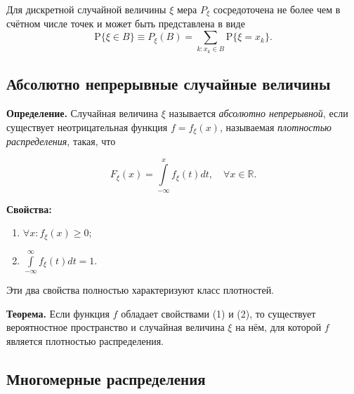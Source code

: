 \documentclass[11pt,a4paper]{article}
\providecommand{\tightlist}{%
      \setlength{\itemsep}{0pt}\setlength{\parskip}{0pt}}
\begin{document}
Для дискретной случайной величины \(\xi\) мера \(P_\xi\) сосредоточена
не более чем в счётном числе точек и может быть представлена в виде \[
  \mathrm{P}\{\xi \in B\} \equiv P_\xi(B) = \sum\limits_{k:x_k \in B} \mathrm{P}\{\xi=x_k\}.
\]

    \hypertarget{ux430ux431ux441ux43eux43bux44eux442ux43dux43e-ux43dux435ux43fux440ux435ux440ux44bux432ux43dux44bux435-ux441ux43bux443ux447ux430ux439ux43dux44bux435-ux432ux435ux43bux438ux447ux438ux43dux44b}{%
\subsection{Абсолютно непрерывные случайные
величины}\label{ux430ux431ux441ux43eux43bux44eux442ux43dux43e-ux43dux435ux43fux440ux435ux440ux44bux432ux43dux44bux435-ux441ux43bux443ux447ux430ux439ux43dux44bux435-ux432ux435ux43bux438ux447ux438ux43dux44b}}

\textbf{Определение.} Случайная величина \(\xi\) называется
\emph{абсолютно непрерывной}, если существует неотрицательная функция
\(f = f_\xi(x)\), называемая \emph{плотностью распределения}, такая, что

\[ F_\xi(x) = \int\limits_{-\infty}^x f_\xi(t) dt, \quad \forall x \in \mathbb{R}. \]

\textbf{Свойства:}

\begin{enumerate}
\def\labelenumi{\arabic{enumi}.}
\tightlist
\item
  \(\forall x: f_\xi (x) \ge 0\);
\item
  \(\int\limits_{-\infty}^{\infty} f_\xi(t) dt = 1\).
\end{enumerate}

Эти два свойства полностью характеризуют класс плотностей.

\textbf{Теорема.} Если функция \(f\) обладает свойствами (1) и (2), то
существует вероятностное пространство и случайная величина \(\xi\) на
нём, для которой \(f\) является плотностью распределения.

    \hypertarget{ux43cux43dux43eux433ux43eux43cux435ux440ux43dux44bux435-ux440ux430ux441ux43fux440ux435ux434ux435ux43bux435ux43dux438ux44f}{%
\subsection{Многомерные
распределения}\label{ux43cux43dux43eux433ux43eux43cux435ux440ux43dux44bux435-ux440ux430ux441ux43fux440ux435ux434ux435ux43bux435ux43dux438ux44f}}
\end{document}
